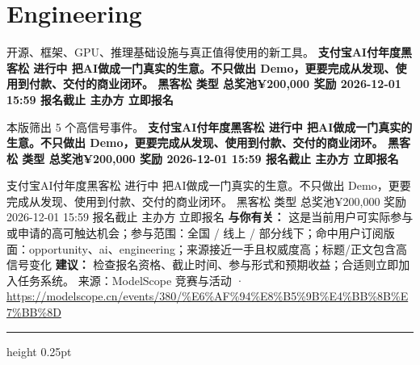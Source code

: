 \documentclass[10.5pt]{ctexart}
\begin{document}
\section*{Engineering}
{\color{ormuted} 开源、框架、GPU、推理基础设施与真正值得使用的新工具。}
\vspace{2mm}
{\LARGE\bfseries 支付宝AI付年度黑客松 进行中 把AI做成一门真实的生意。不只做出 Demo，更要完成从发现、使用到付款、交付的商业闭环。 黑客松 类型 总奖池¥200,000 奖励 2026-12-01 15:59 报名截止 主办方 立即报名}\par
\vspace{1mm}
{\color{ormuted} 本版筛出 5 个高信号事件。}
\vspace{3mm}
{\Large\bfseries 支付宝AI付年度黑客松 进行中 把AI做成一门真实的生意。不只做出 Demo，更要完成从发现、使用到付款、交付的商业闭环。 黑客松 类型 总奖池¥200,000 奖励 2026-12-01 15:59 报名截止 主办方 立即报名}\par
支付宝AI付年度黑客松 进行中 把AI做成一门真实的生意。不只做出 Demo，更要完成从发现、使用到付款、交付的商业闭环。 黑客松 类型 总奖池¥200,000 奖励 2026-12-01 15:59 报名截止 主办方 立即报名
\textbf{与你有关：} 这是当前用户可实际参与或申请的高可触达机会；参与范围：全国 / 线上 / 部分线下；命中用户订阅版面：opportunity、ai、engineering；来源接近一手且权威度高；标题/正文包含高信号变化
\textbf{建议：} 检查报名资格、截止时间、参与形式和预期收益；合适则立即加入任务系统。
{\footnotesize\color{ormuted} 来源：ModelScope 竞赛与活动 · \url{https://modelscope.cn/events/380/%E6%AF%94%E8%B5%9B%E4%BB%8B%E7%BB%8D}}
\vspace{4mm}
\hrule height 0.25pt
\vspace{3mm}
\end{document}
